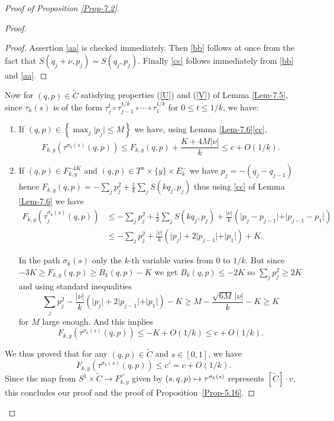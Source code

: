 \documentclass[JEP,XML,SOM,NoFloatCountersInSection,Unicode,published]{cedram}
\newcommand\mto{\mathchoice{\longmapsto}{\mapsto}{\mapsto}{\mapsto}}
\numberwithin{equation}{section}
\theoremstyle{plain}
\theoremstyle{definition}
\theoremstyle{remark}
\begin{document}
\begin{proof}[Proof of Proposition \ref{Prop-7.2}]
\begin{proof}
\begin{proof}
Assertion \eqref{aa} is checked immediately. Then \eqref{bb} follows at once from the fact that $S(q_j+\nu,p_j)=S(q_j,p_j)$. Finally \eqref{cc} follows immediately from \eqref{bb} and \eqref{aa}.
\end{proof}

Now for $(q,p) \in \widetilde C$ satisfying properties (\ref{U}) and (\ref{V}) of Lemma \ref{Lem-7.5}, since $\tau_k(s)$ is of the form $\tau_j^t\circ\tau_{j-1}^{1/k}\circ\cdots\circ\tau_1^{1/k}$ for $0\leq t \leq 1/k$, we have:
\begin{enumerate}
\item If $(q,p) \in \left\{ \max_j \vert p_j \vert \leq M \right\}$ we have, using Lemma \ref{Lem-7.6}\eqref{cc},
\[
F_{k,y}(\tau^{\sigma_k(s)}(q,p))\leq F_{k,y}(q,p)+ \frac{K+4M \vert \nu \vert }{k}\leq c+ O(1/k).
\]
\item If $(q,p) \in F_{k,y}^{-4K}$ and $(q,p) \in T^n\times \{y\}\times E_k^-$ we have $p_j=-(q_j-q_{j-1})$ hence $F_{k,y}(q,p)=-\sum_j p_j^2+\frac{1}{k}\sum_j S(kq_j,p_j) $ thus using \eqref{cc} of Lemma \ref{Lem-7.6} we have
\begin{align*}
F_{k,y}(\tau_j^{\sigma_k(s)}(q,p))&\leq -\sum_j p_j^2+\frac{1}{k}\sum_j S(kq_j,p_j) + \frac{\vert \nu \vert }{k} (\vert p_j-p_{j-1} \vert + \vert p_{j-1}-p_1 \vert)\\
&\leq  -\sum_j p_j^2+ \frac{\vert \nu \vert }{k} (\vert p_j \vert +2 \vert p_{j-1} \vert + \vert p_1 \vert) + K.
\end{align*}

In the path $\sigma_k(s)$ only the $k$-th variable varies from $0$ to $1/k$.
But since $-3K\geq F_{k,y}(q,p)\geq B_k(q,p)-K $ we get $B_k(q,p)\leq -2K $ so $\sum_j p_j^2 \geq 2K$ and using standard inequalities
\[
\sum_j p_j^2- \frac{\vert \nu \vert }{k} (\vert p_j \vert +2 \vert p_{j-1} \vert + \vert p_1 \vert)-K\geq M- \frac{\sqrt {6M}\,\vert \nu \vert }{k}- K\geq K
\]
for $M$ large enough.
And this implies
\[
F_{k,y}(\tau^{\sigma_k(s)}(q,p))\leq -K+ O(1/k)\leq c + O(1/k).
\]
\end{enumerate}

We thus proved that for any $(q,p) \in \widetilde C$ and $s \in [0,1]$, we have
\[
F_{k,y}(\tau^{\sigma_k(s)}(q,p))\leq c'=c +O(1/k).
\]
Since the map from $S^1 \times \widetilde C \to F_{k,y}^{c'}$ given by $(s,q,p) \mto \tau^{\sigma_k(s)}$ represents $[\widetilde C]\cdot v$, this concludes our proof and the proof of Proposition~\ref{Prop-5.16}.
\end{proof}\skipqed
\end{proof}
\end{document}
